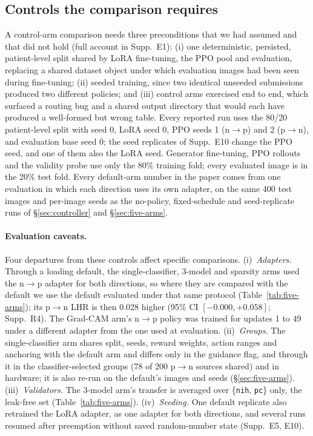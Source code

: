 \subsection{Controls the comparison requires}
\label{sec:controls}

A control-arm comparison needs three preconditions that we had assumed and that did not hold (full account in Supp.~E1): (i) one deterministic, persisted, patient-level split shared by LoRA fine-tuning, the PPO pool and evaluation, replacing a shared dataset object under which evaluation images had been seen during fine-tuning; (ii) seeded training, since two identical unseeded submissions produced two different policies; and (iii) control arms exercised end to end, which surfaced a routing bug and a shared output directory that would each have produced a well-formed but wrong table.
Every reported run uses the 80/20 patient-level split with seed 0, LoRA seed 0, PPO seeds 1 (n$\to$p) and 2 (p$\to$n), and evaluation base seed 0; the seed replicates of Supp.~E10 change the PPO seed, and one of them also the LoRA seed. Generator fine-tuning, PPO rollouts and the validity probe use only the 80\% training fold; every evaluated image is in the 20\% test fold.
Every default-arm number in the paper comes from one evaluation in which each direction uses its own adapter, on the same 400 test images and per-image seeds as the no-policy, fixed-schedule and seed-replicate runs of \S\ref{sec:controller} and \S\ref{sec:five-arms}.

\paragraph{Evaluation caveats.}\label{sec:caveats} Four departures from these controls affect specific comparisons. (i)~\emph{Adapters.} Through a loading default, the single-classifier, 3-model and sparsity arms used the n$\to$p adapter for both directions, so where they are compared with the default we use the default evaluated under that same protocol (Table~\ref{tab:five-arms}); its p$\to$n LHR is then 0.028 higher (95\% CI $[-0.000, +0.058]$; Supp.~R4). The Grad-CAM arm's n$\to$p policy was trained for updates 1 to 49 under a different adapter from the one used at evaluation. (ii)~\emph{Groups.} The single-classifier arm shares split, seeds, reward weights, action ranges and anchoring with the default arm and differs only in the guidance flag, and through it in the classifier-selected groups (78 of 200 p$\to$n sources shared) and in hardware; it is also re-run on the default's images and seeds (\S\ref{sec:five-arms}). (iii)~\emph{Validators.} The 3-model arm's transfer is averaged over \{\texttt{nih}, \texttt{pc}\} only, the leak-free set (Table~\ref{tab:five-arms}). (iv)~\emph{Seeding.} One default replicate also retrained the LoRA adapter, as one adapter for both directions, and several runs resumed after preemption without saved random-number state (Supp.~E5, E10).
